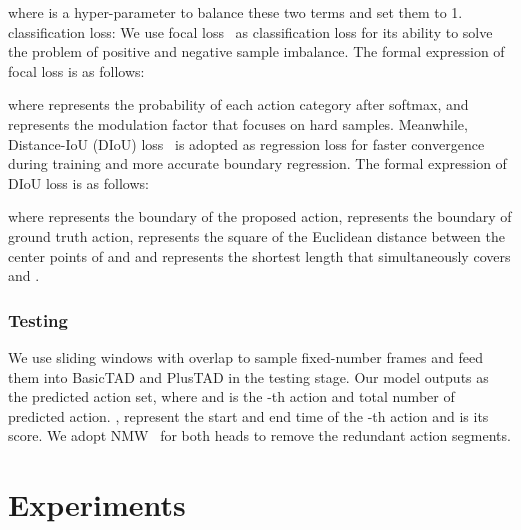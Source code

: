 \documentclass[a4paper,fleqn]{cas-dc}
\begin{document}
where  is a hyper-parameter to balance these two terms and set them to 1. classification loss: We use focal loss~\citep{focalloss} as classification loss for its ability to solve the problem of positive and negative sample imbalance. The formal expression of focal loss is as follows:
 
where  represents the probability of each action category after softmax, and  represents the modulation factor that focuses on hard samples. 
Meanwhile, Distance-IoU (DIoU) loss~\citep{diou} is adopted as regression loss for faster convergence during training and more accurate boundary regression. The formal expression of DIoU loss is as follows:
 
where  represents the boundary of the proposed action,  represents the boundary of ground truth action,  represents the square of the Euclidean distance between the center points of  and  and  represents the shortest length that simultaneously covers  and .


\subsubsection{Testing}
We use sliding windows with overlap to sample fixed-number frames and feed them into BasicTAD and PlusTAD in the testing stage. 
Our model outputs  as the predicted action set, where  and  is the -th action and total number of predicted action. ,  represent the start and end time of the -th action  and  is its score. 
We adopt NMW~\citep{nmw} for both heads to remove the redundant action segments.

\section{Experiments}

\begin{table}[t]
\centering
\small
\caption{\textbf{Summary of three datasets.} Video number, category number and other information about THUMOS14, FineAction and ActivityNet-v1.3 are listed in this table.}
\label{table:dataset_info}
\end{table}
\end{document}
